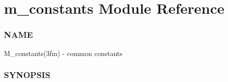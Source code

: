 \hypertarget{namespacem__constants}{}\section{m\+\_\+constants Module Reference}
\label{namespacem__constants}


\subsubsection*{N\+A\+ME}

M\+\_\+constants(3fm) -\/ common constants \subsubsection*{S\+Y\+N\+O\+P\+S\+IS} 


